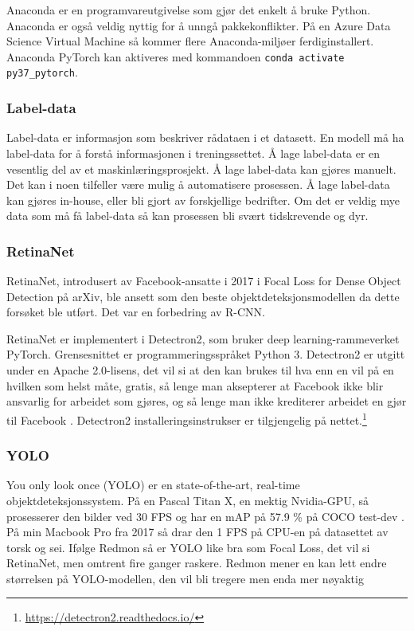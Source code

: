 Anaconda er en programvareutgivelse som gjør det enkelt å bruke Python. Anaconda er også veldig nyttig for å unngå pakkekonflikter. På en Azure Data Science Virtual Machine så kommer flere Anaconda-miljøer ferdiginstallert. Anaconda PyTorch kan aktiveres med kommandoen \texttt{conda activate py37\_pytorch}. \cite{Mallick m.fl. 2020} %

\subsubsection{Label-data}

Label-data er informasjon som beskriver rådataen i et datasett. En modell må ha label-data for å forstå informasjonen i treningssettet. Å lage label-data er en vesentlig del av et maskinlæringsprosjekt. Å lage label-data kan gjøres manuelt. Det kan i noen tilfeller være mulig å automatisere prosessen. Å lage label-data kan gjøres in-house, eller bli gjort av forskjellige bedrifter. Om det er veldig mye data som må få label-data så kan prosessen bli svært tidskrevende og dyr. \cite{Kaller 2019}


\subsubsection{RetinaNet}

RetinaNet, introdusert av Facebook-ansatte i 2017 i Focal Loss for Dense Object Detection på arXiv, ble ansett som den beste objektdeteksjonsmodellen da dette forsøket ble utført. Det var en forbedring av R-CNN. \cite{Lin m.fl. 2017}

RetinaNet er implementert i Detectron2, som bruker deep learning-rammeverket PyTorch. Grensesnittet er programmeringsspråket Python 3. Detectron2 er utgitt under en Apache 2.0-lisens, det vil si at den kan brukes til hva enn en vil på en hvilken som helst måte, gratis, så lenge man aksepterer at Facebook ikke blir ansvarlig for arbeidet som gjøres, og så lenge man ikke krediterer arbeidet en gjør til Facebook \cite{The Apache Software Foundation 2004}. Detectron2 installeringsinstrukser er tilgjengelig på nettet.\footnote{\url{https://detectron2.readthedocs.io/}}

\subsubsection{YOLO}

You only look once (YOLO) er en state-of-the-art, real-time objektdeteksjonssystem. På en Pascal Titan X, en mektig Nvidia-GPU, så prosesserer den bilder ved 30 FPS og har en mAP på 57.9 \% på COCO test-dev \cite{Redmon 2018}. På min Macbook Pro fra 2017 så drar den 1 FPS på CPU-en på datasettet av torsk og sei. Ifølge Redmon så er YOLO like bra som Focal Loss, det vil si RetinaNet, men omtrent fire ganger raskere. Redmon mener en kan lett endre størrelsen på YOLO-modellen, den vil bli tregere men enda mer nøyaktig \cite{Redmon 2016}%

